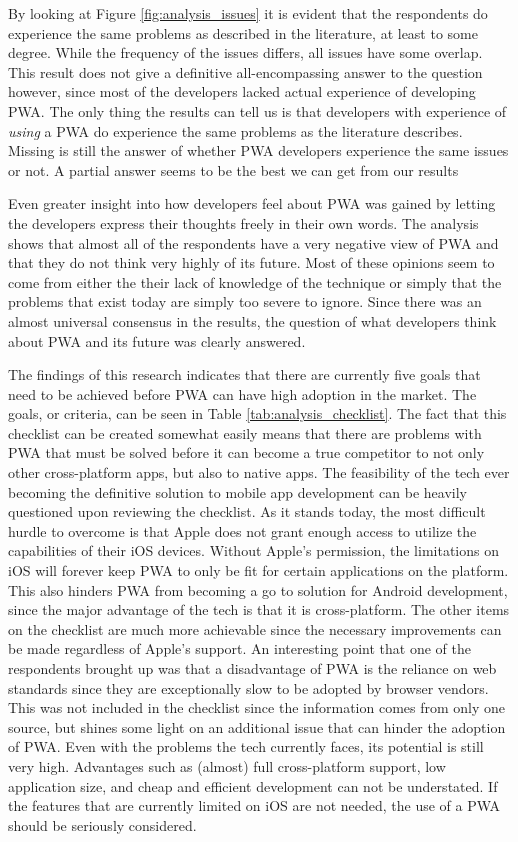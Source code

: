 \documentclass[a4paper,12pt]{article}
\begin{document}
By looking at Figure \ref{fig:analysis_issues} it is evident that the respondents do experience the same problems as described in the literature, at least to some degree. While the frequency of the issues differs, all issues have some overlap. This result does not give a definitive all-encompassing answer to the question however, since most of the developers lacked actual experience of developing PWA. The only thing the results can tell us is that developers with experience of \textit{using} a PWA do experience the same problems as the literature describes. Missing is still the answer of whether PWA developers experience the same issues or not. A partial answer seems to be the best we can get from our results

Even greater insight into how developers feel about PWA was gained by letting the developers express their thoughts freely in their own words. The analysis shows that almost all of the respondents have a very negative view of PWA and that they do not think very highly of its future. Most of these opinions seem to come from either the their lack of knowledge of the technique or simply that the problems that exist today are simply too severe to ignore. Since there was an almost universal consensus in the results, the question of what developers think about PWA and its future was clearly answered. 

The findings of this research indicates that there are currently five goals that need to be achieved before PWA can have high adoption in the market. The goals, or criteria, can be seen in Table \ref{tab:analysis_checklist}. The fact that this checklist can be created somewhat easily means that there are problems with PWA that must be solved before it can become a true competitor to not only other cross-platform apps, but also to native apps. The feasibility of the tech ever becoming the definitive solution to mobile app development can be heavily questioned upon reviewing the checklist. As it stands today, the most difficult hurdle to overcome is that Apple does not grant enough access to utilize the capabilities of their iOS devices. Without Apple's permission, the limitations on iOS will forever keep PWA to only be fit for certain applications on the platform. This also hinders PWA from becoming a go to solution for Android development, since the major advantage of the tech is that it is cross-platform. The other items on the checklist are much more achievable since the necessary improvements can be made regardless of Apple's support. An interesting point that one of the respondents brought up was that a disadvantage of PWA is the reliance on web standards since they are exceptionally slow to be adopted by browser vendors. This was not included in the checklist since the information comes from only one source, but shines some light on an additional issue that can hinder the adoption of PWA. Even with the problems the tech currently faces, its potential is still very high. Advantages such as (almost) full cross-platform support, low application size, and cheap and efficient development can not be understated. If the features that are currently limited on iOS are not needed, the use of a PWA should be seriously considered.
\end{document}

